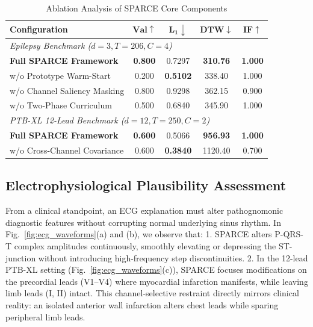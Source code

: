 \documentclass[conference]{IEEEtran}
\begin{document}
\begin{table}[!t]
\caption{Ablation Analysis of SPARCE Core Components}
\label{tab:ablation}
\centering
\scriptsize
\setlength{\tabcolsep}{4.0pt}
\begin{tabular}{lcccc}
\toprule
\textbf{Configuration} & $\mathbf{Val} \uparrow$ & $\mathbf{L_1} \downarrow$ & $\mathbf{DTW} \downarrow$ & $\mathbf{IF} \uparrow$ \\
\midrule
\multicolumn{5}{l}{\textit{Epilepsy Benchmark ($d=3, T=206, C=4$)}} \\
\textbf{Full SPARCE Framework} & \textbf{0.800} & 0.7297 & \textbf{310.76} & \textbf{1.000} \\
w/o Prototype Warm-Start & 0.200 & \textbf{0.5102} & 338.40 & 1.000 \\
w/o Channel Saliency Masking & 0.800 & 0.9298 & 362.15 & 0.900 \\
w/o Two-Phase Curriculum & 0.500 & 0.6840 & 345.90 & 1.000 \\
\midrule
\multicolumn{5}{l}{\textit{PTB-XL 12-Lead Benchmark ($d=12, T=250, C=2$)}} \\
\textbf{Full SPARCE Framework} & \textbf{0.600} & 0.5066 & \textbf{956.93} & \textbf{1.000} \\
w/o Cross-Channel Covariance & 0.600 & \textbf{0.3840} & 1120.40 & 0.700 \\
\bottomrule
\end{tabular}
\end{table}

\subsection{Electrophysiological Plausibility Assessment}
From a clinical standpoint, an ECG explanation must alter pathognomonic diagnostic features without corrupting normal underlying sinus rhythm. In Fig.~\ref{fig:ecg_waveforms}(a) and (b), we observe that:
1. SPARCE alters P-QRS-T complex amplitudes continuously, smoothly elevating or depressing the ST-junction without introducing high-frequency step discontinuities.
2. In the 12-lead PTB-XL setting (Fig.~\ref{fig:ecg_waveforms}(c)), SPARCE focuses modifications on the precordial leads (V1--V4) where myocardial infarction manifests, while leaving limb leads (I, II) intact.
This channel-selective restraint directly mirrors clinical reality: an isolated anterior wall infarction alters chest leads while sparing peripheral limb leads.
\end{document}
